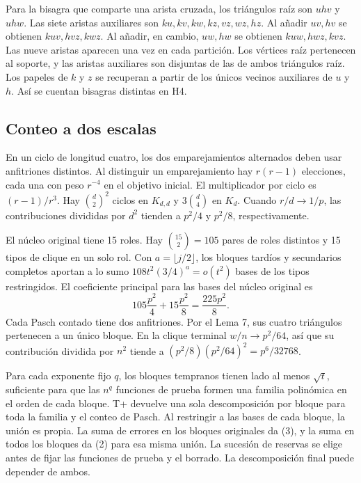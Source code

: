 \documentclass[spanish,11pt,a4paper]{article}
\begin{document}
Para la bisagra que comparte una arista cruzada, los triángulos raíz son \(uhv\) y \(uhw\). Las siete aristas auxiliares son \(ku,kv,kw,kz,vz,wz,hz\). Al añadir \(uv,hv\) se obtienen \(kuv,hvz,kwz\). Al añadir, en cambio, \(uw,hw\) se obtienen \(kuw,hwz,kvz\). Las nueve aristas aparecen una vez en cada partición. Los vértices raíz pertenecen al soporte, y las aristas auxiliares son disjuntas de las de ambos triángulos raíz. Los papeles de \(k\) y \(z\) se recuperan a partir de los únicos vecinos auxiliares de \(u\) y \(h\). Así se cuentan bisagras distintas en H4.

\subsection{Conteo a dos escalas}\label{conteo-a-dos-escalas}

En un ciclo de longitud cuatro, los dos emparejamientos alternados deben usar anfitriones distintos. Al distinguir un emparejamiento hay \(r(r-1)\) elecciones, cada una con peso \(r^{-4}\) en el objetivo inicial. El multiplicador por ciclo es \((r-1)/r^3\). Hay \(\binom d2^2\) ciclos en \(K_{d,d}\) y \(3\binom d4\) en \(K_d\). Cuando \(r/d\to1/p\), las contribuciones divididas por \(d^2\) tienden a \(p^2/4\) y \(p^2/8\), respectivamente.

El núcleo original tiene 15 roles. Hay \(\binom{15}{2}=105\) pares de roles distintos y 15 tipos de clique en un solo rol. Con \(a=\lfloor j/2\rfloor\), los bloques tardíos y secundarios completos aportan a lo sumo \(108t^2(3/4)^a=o(t^2)\) bases de los tipos restringidos. El coeficiente principal para las bases del núcleo original es \[105\frac{p^2}{4}+15\frac{p^2}{8}=\frac{225p^2}{8}.\] Cada Pasch contado tiene dos anfitriones. Por el Lema 7, sus cuatro triángulos pertenecen a un único bloque. En la clique terminal \(w/n\to p^2/64\), así que su contribución dividida por \(n^2\) tiende a \((p^2/8)(p^2/64)^2=p^6/32768\).

Para cada exponente fijo \(q\), los bloques tempranos tienen lado al menos \(\sqrt t\), suficiente para que las \(n^q\) funciones de prueba formen una familia polinómica en el orden de cada bloque. T+ devuelve una sola descomposición por bloque para toda la familia y el conteo de Pasch. Al restringir a las bases de cada bloque, la unión es propia. La suma de errores en los bloques originales da (3), y la suma en todos los bloques da (2) para esa misma unión. La sucesión de reservas se elige antes de fijar las funciones de prueba y el borrado. La descomposición final puede depender de ambos.
\end{document}
